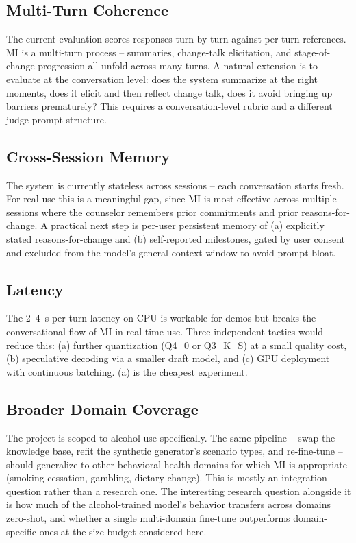 \subsection{Multi-Turn Coherence}
The current evaluation scores responses turn-by-turn against per-turn
references. MI is a multi-turn process -- summaries, change-talk
elicitation, and stage-of-change progression all unfold across many turns.
A natural extension is to evaluate at the conversation level: does the
system summarize at the right moments, does it elicit and then reflect change
talk, does it avoid bringing up barriers prematurely? This requires a
conversation-level rubric and a different judge prompt structure.

\subsection{Cross-Session Memory}
The system is currently stateless across sessions -- each conversation starts
fresh. For real use this is a meaningful gap, since MI is most effective
across multiple sessions where the counselor remembers prior commitments and
prior reasons-for-change. A practical next step is per-user persistent memory
of (a) explicitly stated reasons-for-change and (b) self-reported milestones,
gated by user consent and excluded from the model's general context window
to avoid prompt bloat.

\subsection{Latency}
The 2--4~s per-turn latency on CPU is workable for demos but breaks the
conversational flow of MI in real-time use. Three independent tactics would
reduce this: (a) further quantization (Q4\_0 or Q3\_K\_S) at a small quality
cost, (b) speculative decoding via a smaller draft model, and (c) GPU
deployment with continuous batching. (a) is the cheapest experiment.

\subsection{Broader Domain Coverage}
The project is scoped to alcohol use specifically. The same pipeline -- swap
the knowledge base, refit the synthetic generator's scenario types, and
re-fine-tune -- should generalize to other behavioral-health domains for
which MI is appropriate (smoking cessation, gambling, dietary change). This
is mostly an integration question rather than a research one. The interesting
research question alongside it is how much of the alcohol-trained model's
behavior transfers across domains zero-shot, and whether a single
multi-domain fine-tune outperforms domain-specific ones at the size budget
considered here.
